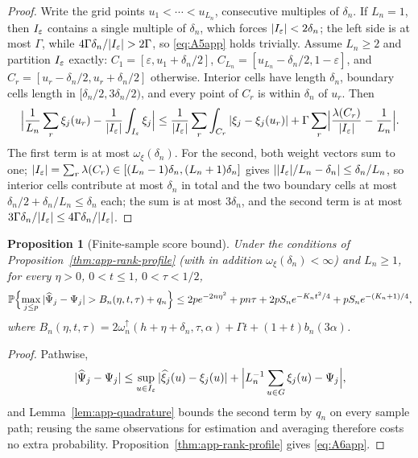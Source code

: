 \documentclass[bj,authoryear]{imsart}
\theoremstyle{plain}
\newtheorem{proposition}[theorem]{Proposition}
\begin{document}
\begin{appendix}
\begin{proof}
Write the grid points $u_1<\cdots<u_{L_n}$, consecutive multiples of
$\delta_n$.  If $L_n=1$, then $I_\varepsilon$ contains a single multiple of
$\delta_n$, which forces $|I_\varepsilon|<2\delta_n$; the left side is at most
$\Gamma$, while $4\Gamma\delta_n/|\I|>2\Gamma$, so \eqref{eq:A5app}
holds trivially.  Assume $L_n\ge2$ and partition $I_\varepsilon$
exactly: $C_1=[\varepsilon,u_1+\delta_n/2]$,
$C_{L_n}=[u_{L_n}-\delta_n/2,1-\varepsilon]$, and
$C_r=[u_r-\delta_n/2,u_r+\delta_n/2]$ otherwise.  Interior cells have
length $\delta_n$, boundary cells length in $[\delta_n/2,3\delta_n/2)$,
and every point of $C_r$ is within $\delta_n$ of $u_r$.  Then
\[
 \Bigl|\frac1{L_n}\sum_r\xi_j(u_r)-\frac1{|I_\varepsilon|}\int_{I_\varepsilon}\xi_j\Bigr|
 \le\frac1{|I_\varepsilon|}\sum_r\int_{C_r}|\xi_j-\xi_j(u_r)|
 +\Gamma\sum_r\Bigl|\frac{\lambda(C_r)}{|I_\varepsilon|}-\frac1{L_n}\Bigr|.
\]
The first term is at most $\omega_\xi(\delta_n)$.  For the second, both
weight vectors sum to one;
$|I_\varepsilon|=\sum_r\lambda(C_r)\in[(L_n-1)\delta_n,(L_n+1)\delta_n]$ gives
$||I_\varepsilon|/L_n-\delta_n|\le\delta_n/L_n$, so interior cells contribute at most
$\delta_n$ in total and the two boundary cells at most
$\delta_n/2+\delta_n/L_n\le\delta_n$ each; the sum is at most $3\delta_n$,
and the second term is at most $3\Gamma\delta_n/|I_\varepsilon|\le
4\Gamma\delta_n/|I_\varepsilon|$.
\end{proof}

\begin{proposition}[Finite-sample score bound]\label{thm:app-score}
Under the conditions of Proposition~\ref{thm:app-rank-profile} (with in
addition $\omega_\xi(\delta_n)<\infty$) and $L_n\ge1$, for every
$\eta>0$, $0<t\le1$, $0<\tau<1/2$,
\begin{align}
 \mathbb P\Bigl\{\max_{j\le p}|\widehat\Psi_j-\Psi_j|
 >B_n(\eta,t,\tau)+q_n\Bigr\}
 \le
 2pe^{-2n\eta^2}+pn\tau+2pS_ne^{-K_nt^2/4}+pS_ne^{-(K_n+1)/4},
 \label{eq:A6app}
\end{align}
where
$B_n(\eta,t,\tau)=2\omega_n^{\uparrow}(h+\eta+\delta_n,\tau,\alpha)+\Gamma t
+(1+t)b_n(3\alpha)$.
\end{proposition}

\begin{proof}
Pathwise,
\[
 |\widehat\Psi_j-\Psi_j|
 \le\sup_{u\in I_\varepsilon}|\widehat\xi_j(u)-\xi_j(u)|
 +\Bigl|L_n^{-1}\sum_{u\in G}\xi_j(u)-\Psi_j\Bigr|,
\]
and Lemma~\ref{lem:app-quadrature} bounds the second term by $q_n$ on
every sample path; reusing the same observations for estimation and
averaging therefore costs no extra probability.
Proposition~\ref{thm:app-rank-profile} gives \eqref{eq:A6app}.
\end{proof}


\end{appendix}
\end{document}
